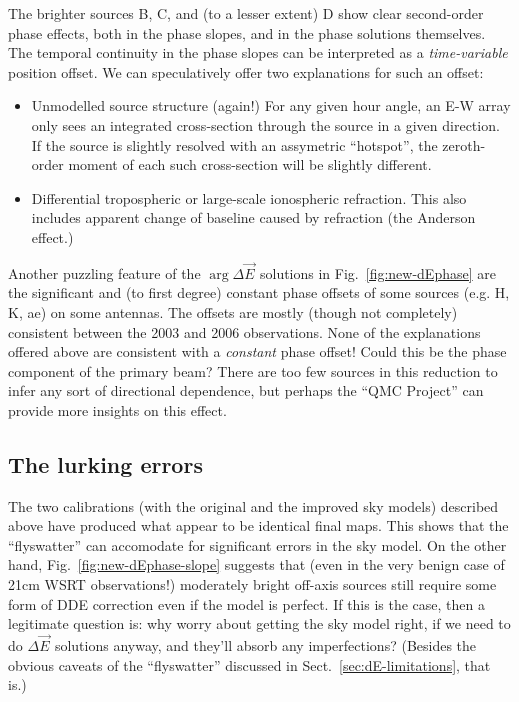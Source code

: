\documentclass[]{aa}
\newcommand{\jones}[2]{\vec {#1}_{#2}}
\begin{document}
The brighter sources B, C, and (to a lesser extent) D show clear second-order phase effects, both in the phase slopes, and in the phase solutions themselves. The temporal continuity in the phase slopes can be interpreted as a \emph{time-variable} position offset. We can speculatively offer two explanations for such an offset:

\begin{itemize}
\item Unmodelled source structure (again!) For any given hour angle, an E-W array only sees an integrated cross-section through the source in a given direction. If the source is slightly resolved with an assymetric ``hotspot'', the zeroth-order moment of each such cross-section will be slightly different. 
\item Differential tropospheric or large-scale ionospheric refraction. This also includes apparent change of baseline caused by refraction (the Anderson effect.)
\end{itemize}

Another puzzling feature of the $\arg\Delta\jones{E}{}$ solutions in Fig.~\ref{fig:new-dEphase}
are the significant and (to first degree) constant phase offsets of some sources (e.g. H, K, ae) on some antennas. The offsets are mostly (though not completely) consistent between the 2003 and 2006 observations. None of the explanations offered above are consistent with a \emph{constant} phase offset! Could this be the phase component of the primary beam? There are too few sources in this reduction to infer any sort of directional dependence, but perhaps the ``QMC Project'' \citep{QMC} can provide more insights on this effect.

\subsection{The lurking errors\label{sec:deep-errors}}

The two calibrations (with the original and the improved sky models) described above have produced what appear to be identical final maps. This shows that the ``flyswatter'' can accomodate for significant errors in the sky model. On the other hand, Fig.~\ref{fig:new-dEphase-slope} suggests that (even in the very benign case of 21cm WSRT observations!) moderately bright off-axis sources still require some form of DDE correction even if the model is perfect. If this is the case, then a legitimate question is: why worry about getting the sky model right, if we need to do $\Delta\jones{E}{}$ solutions anyway, and they'll absorb any imperfections? (Besides the obvious caveats of the ``flyswatter'' discussed in Sect.~\ref{sec:dE-limitations}, that is.)
\end{document}
